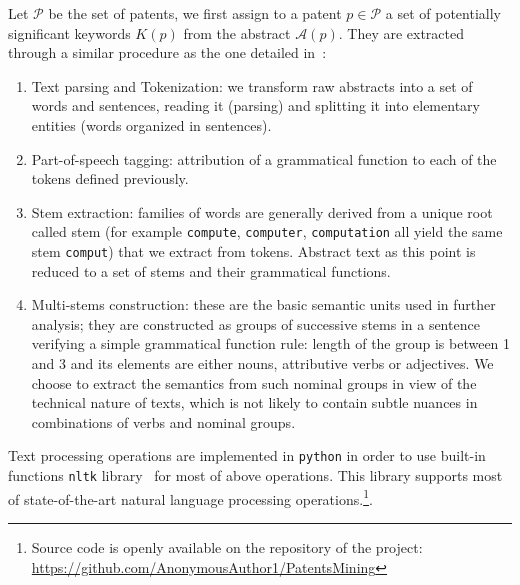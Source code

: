 \documentclass[10pt,A4]{article}
\begin{document}
Let $\mathcal{P}$ be the set of patents, we first assign to a patent $p\in \mathcal{P}$ a set of potentially significant keywords $K(p)$ from the abstract ${\mathcal{A}}(p)$.
They are extracted through a similar procedure as the one detailed in~\cite{chavalarias2013phylomemetic}: 
\begin{enumerate}
\item Text parsing and Tokenization: we transform raw abstracts into a set of words and sentences, reading it (parsing) and splitting it into elementary entities (words organized in sentences).
\item Part-of-speech tagging: attribution of a grammatical function to each of the tokens defined previously.
\item Stem extraction: families of words are generally derived from a unique root called stem (for example \texttt{compute}, \texttt{computer}, \texttt{computation} all yield the same stem \texttt{comput}) that we extract from tokens. Abstract text as this point is reduced to a set of stems and their grammatical functions.
\item Multi-stems construction: these are the basic semantic units used in further analysis; they are constructed as groups of successive stems in a sentence verifying a simple grammatical function rule: length of the group is between 1 and 3 and its elements are either nouns, attributive verbs or adjectives.
We choose to extract the semantics from such nominal groups in view of the technical nature of texts, which is not likely to contain subtle nuances in combinations of verbs and nominal groups.
\end{enumerate}

Text processing operations are implemented in \texttt{python} in order to use built-in functions \texttt{nltk} library~\cite{nltk} for most of above operations. This library supports most of state-of-the-art natural language processing operations.\footnote{Source code is openly available on the repository of the project: \url{https://github.com/AnonymousAuthor1/PatentsMining} %
}.
\end{document}
